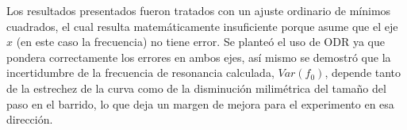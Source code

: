 Los resultados presentados fueron tratados con un ajuste ordinario de mínimos cuadrados, el cual resulta matemáticamente insuficiente porque asume que el eje $x$ (en este caso la frecuencia) no tiene error. Se planteó el uso de \ac{ODR} ya que pondera correctamente los errores en ambos ejes, así mismo se demostró que la incertidumbre de la frecuencia de resonancia calculada, $Var(f_0)$, depende tanto de la estrechez de la curva como de la disminución milimétrica del tamaño del paso en el barrido, lo que deja un margen de mejora para el experimento en esa dirección.


